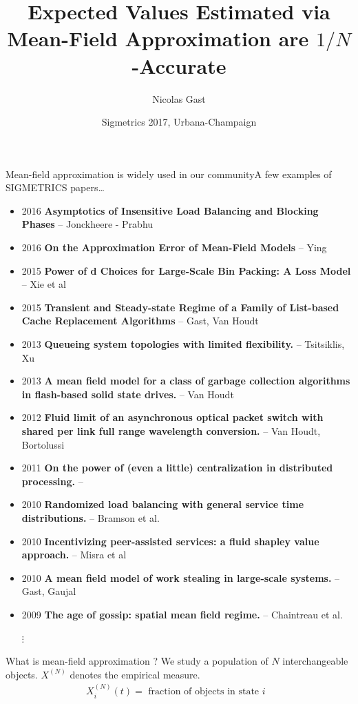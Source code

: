 \documentclass{beamer}
\newcommand\XN{X^{(N)}}
\begin{document}
\title{Expected Values Estimated via Mean-Field Approximation are
  $1/N$-Accurate }%
\author{Nicolas Gast}%
%
\date[Urbana-Champaign, June 2017]{Sigmetrics 2017, Urbana-Champaign }%

\maketitle


\newcommand\newcite[3]{\item[#1] \textbf{#2} -- #3}
\begin{frame}{Mean-field approximation is widely used in our
    community}{A few examples of SIGMETRICS papers\dots}
  
  \footnotesize 
  \begin{itemize}
  \newcite{2016}{ Asymptotics of Insensitive Load Balancing and Blocking
    Phases}{Jonckheere - Prabhu}
  \newcite{2016}{ On the Approximation Error of Mean-Field Models}{Ying}
  \newcite{2015}{ Power of d Choices for Large-Scale Bin Packing: A Loss
    Model}{Xie et al} 
  \newcite{2015}{ Transient and Steady-state Regime of a Family of
    List-based Cache Replacement Algorithms}{Gast, Van Houdt} 
  \newcite{2013}{  Queueing system topologies with limited
    flexibility.}{Tsitsiklis, Xu}
  \newcite{2013}{ A mean field model for a class of garbage collection
    algorithms in flash-based solid state drives.}{Van Houdt}
  \newcite{2012}{ Fluid limit of an asynchronous optical packet switch
    with shared per link full range wavelength conversion.}{Van Houdt,
    Bortolussi}

  \newcite{2011}{ On the power of (even a little) centralization in
    distributed processing. }
  \newcite{2010}{ Randomized load balancing with general service time
    distributions.}{Bramson et al.}
  \newcite{2010}{ Incentivizing peer-assisted services: a fluid shapley
    value approach.}{Misra et al}
  \newcite{2010}{ A mean field model of work stealing in large-scale
    systems.}{Gast, Gaujal} 
  \newcite{2009}{
The age of gossip: spatial mean field regime.}{Chaintreau et al.}
\item[$\vdots$~~]
  \end{itemize}
\end{frame}

\newcommand\object[1]{\node[fill] at (#1) {~};}
\begin{frame}{What is mean-field approximation ?}
  {We study a population of $N$ interchangeable objects. }
  $\XN$ denotes the empirical measure.
  \begin{align*}
    \XN_i(t) = \text{ fraction of objects in state $i$ }
  \end{align*}
  

\end{frame}
\end{document}

